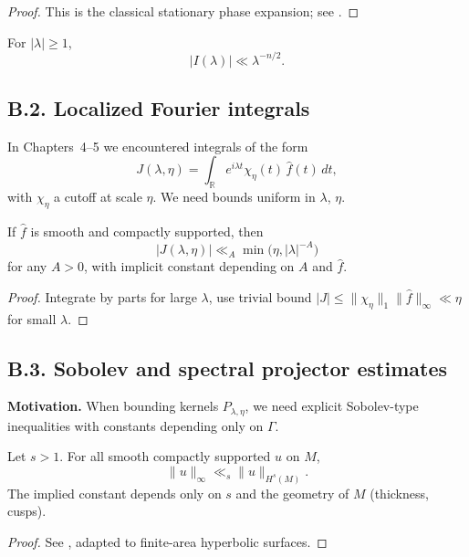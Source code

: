 \begin{proof}
This is the classical stationary phase expansion; see \cite[Thm.~7.7.5]{Hormander1983}.
\end{proof}

\begin{corollary}\label{cor:uniform-stationary}
For $|\lambda|\ge 1$,
\[
|I(\lambda)| \ll \lambda^{-n/2}.
\]
\end{corollary}

\subsection*{B.2. Localized Fourier integrals}

\noindent
In Chapters~4--5 we encountered integrals of the form
\[
J(\lambda,\eta) = \int_{\mathbb R} e^{i\lambda t} \chi_\eta(t)\, \hat{f}(t)\,dt,
\]
with $\chi_\eta$ a cutoff at scale $\eta$. We need bounds uniform in $\lambda$,
$\eta$.

\begin{lemma}\label{lem:decay-local}
If $\hat{f}$ is smooth and compactly supported, then
\[
|J(\lambda,\eta)| \ll_A \min\big(\eta, |\lambda|^{-A}\big)
\]
for any $A>0$, with implicit constant depending on $A$ and $\hat{f}$.
\end{lemma}

\begin{proof}
Integrate by parts for large $\lambda$, use trivial bound $|J|\le \|\chi_\eta\|_1\|\hat{f}\|_\infty \ll \eta$ for small $\lambda$.
\end{proof}

\subsection*{B.3. Sobolev and spectral projector estimates}

\noindent
\textbf{Motivation.}
When bounding kernels $P_{\lambda,\eta}$, we need explicit Sobolev-type
inequalities with constants depending only on $\Gamma$.

\begin{lemma}\label{lem:sobolev-hyp}
Let $s>1$. For all smooth compactly supported $u$ on $M$,
\[
\|u\|_\infty \ll_s \|u\|_{H^s(M)}.
\]
The implied constant depends only on $s$ and the geometry of $M$ (thickness,
cusps).
\end{lemma}

\begin{proof}
See \cite[Thm.~2.1]{Iwaniec2002}, adapted to finite-area hyperbolic surfaces.
\end{proof}


